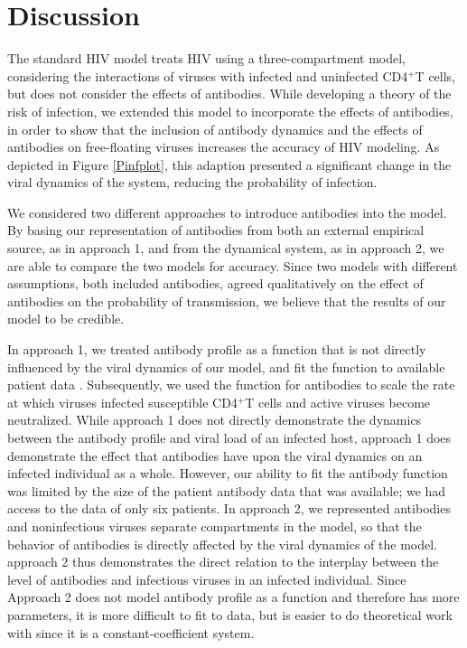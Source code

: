 \documentclass[]{elsarticle}
\theoremstyle{definition}
\begin{document}
\section{Discussion}
The standard HIV model \cite{perelson2013modeling} treats HIV using a three-compartment model, considering the interactions of viruses with infected and uninfected CD4$^+$T cells, but does not consider the effects of antibodies. While developing a theory of the risk of infection, we extended this model to incorporate the effects of antibodies, in order to show that the inclusion of antibody dynamics and the effects of antibodies on free-floating viruses increases the accuracy of HIV modeling. As depicted in Figure \ref{Pinfplot}, this adaption presented a significant change in the viral dynamics of the system, reducing the probability of infection.

We considered two different approaches to introduce antibodies into the model. By basing our representation of antibodies from both an external empirical source, as in approach 1, and from the dynamical system, as in approach 2, we are able to compare the two models for accuracy. Since two models with different assumptions, both included antibodies, agreed qualitatively on the effect of antibodies on the probability of transmission, we believe that the results of our model to be credible.

In approach 1, we treated antibody profile as a function that is not directly influenced by the viral dynamics of our model, and fit the function to available patient data \cite{CHIDPatients}. Subsequently, we used the function for antibodies to scale the rate at which viruses infected susceptible CD4$^+$T cells and active viruses become neutralized. While approach 1 does not directly demonstrate the dynamics between the antibody profile and viral load of an infected host, approach 1 does demonstrate the effect that antibodies have upon the viral dynamics on an infected individual as a whole. However, our ability to fit the antibody function was limited by the size of the patient antibody data that was available; we had access to the data of only six patients. In approach 2, we represented antibodies and noninfectious viruses separate compartments in the model, so that the behavior of antibodies is directly affected by the viral dynamics of the model. approach 2 thus demonstrates the direct relation to the interplay between the level of antibodies and infectious viruses in an infected individual. Since Approach 2 does not model antibody profile as a function and therefore has more parameters, it is more difficult to fit to data, but is easier to do theoretical work with since it is a constant-coefficient system.
\end{document}
